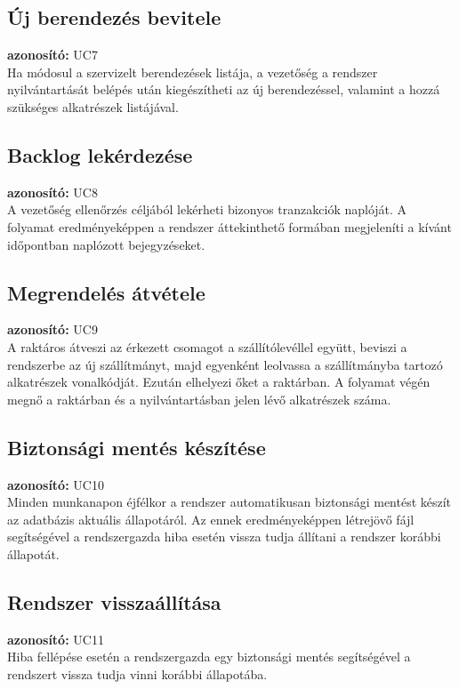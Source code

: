 \documentclass[12pt]{article}\usepackage[left=20mm,right=20mm,top=14mm,bottom=20mm]{geometry}
\begin{document}
\subsection{Új berendezés bevitele}
\textbf{azonosító: } UC7 \\
Ha módosul a szervizelt berendezések listája, a vezetőség a rendszer nyilvántartását belépés után kiegészítheti az új berendezéssel, valamint a hozzá szükséges alkatrészek listájával.

\subsection{Backlog lekérdezése}
\textbf{azonosító: } UC8 \\
A vezetőség ellenőrzés céljából lekérheti bizonyos tranzakciók naplóját. 
A folyamat eredményeképpen a rendszer áttekinthető formában megjeleníti a kívánt időpontban naplózott bejegyzéseket.

\subsection{Megrendelés átvétele}
\textbf{azonosító: } UC9 \\
A raktáros átveszi az érkezett csomagot a szállítólevéllel együtt, beviszi a rendszerbe az új szállítmányt, majd egyenként leolvassa a szállítmányba tartozó alkatrészek vonalkódját.
Ezután elhelyezi őket a raktárban.
A folyamat végén megnő a raktárban és a nyilvántartásban jelen lévő alkatrészek száma.

\subsection{Biztonsági mentés készítése}
\textbf{azonosító: } UC10 \\
Minden munkanapon éjfélkor a rendszer automatikusan biztonsági mentést készít az adatbázis aktuális állapotáról.
Az ennek eredményeképpen létrejövő fájl segítségével a rendszergazda hiba esetén vissza tudja állítani a rendszer korábbi állapotát.

\subsection{Rendszer visszaállítása}
\textbf{azonosító: } UC11 \\
Hiba fellépése esetén a rendszergazda egy biztonsági mentés segítségével a rendszert vissza tudja vinni korábbi állapotába.
\end{document}
